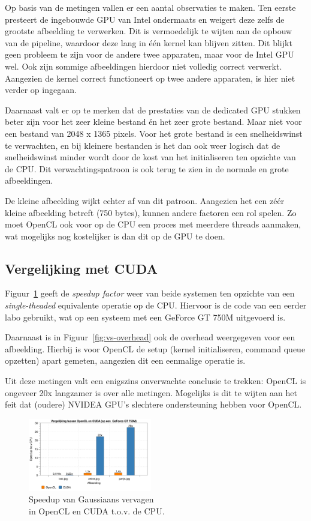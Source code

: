 \documentclass[twocolumn, a4paper]{article}
\begin{document}
Op basis van de metingen vallen er een aantal observaties te maken. Ten eerste presteert de ingebouwde GPU van Intel ondermaats en weigert deze zelfs de grootste afbeelding te verwerken. Dit is vermoedelijk te wijten aan de opbouw van de pipeline, waardoor deze lang in één kernel kan blijven zitten. Dit blijkt geen probleem te zijn voor de andere twee apparaten, maar voor de Intel GPU wel. Ook zijn sommige afbeeldingen hierdoor niet volledig correct verwerkt. Aangezien de kernel correct functioneert op twee andere apparaten, is hier niet verder op ingegaan.

Daarnaast valt er op te merken dat de prestaties van de dedicated GPU stukken beter zijn voor het zeer kleine bestand én het zeer grote bestand. Maar niet voor een bestand van 2048 x 1365 pixels. Voor het grote bestand is een snelheidswinst te verwachten, en bij kleinere bestanden is het dan ook weer logisch dat de snelheidswinst minder wordt door de kost van het initialiseren ten opzichte van de CPU. Dit verwachtingspatroon is ook terug te zien in de normale en grote afbeeldingen. 

De kleine afbeelding wijkt echter af van dit patroon. Aangezien het een zéér kleine afbeelding betreft (750 bytes), kunnen andere factoren een rol spelen. Zo moet OpenCL ook voor op de CPU een proces met meerdere threads aanmaken, wat mogelijks nog kostelijker is dan dit op de GPU te doen. 

\subsection{Vergelijking met CUDA}
Figuur~\ref{fig:vs} geeft de \emph{speedup factor} weer van beide systemen ten opzichte van een \emph{single-theaded} equivalente operatie op de CPU. Hiervoor is de code van een eerder labo gebruikt, wat op een systeem met een GeForce GT 750M uitgevoerd is. 

Daarnaast is in Figuur~\ref{fig:vs-overhead} ook de overhead weergegeven voor een afbeelding. Hierbij is voor OpenCL de setup (kernel initialiseren, command queue opzetten) apart gemeten, aangezien dit een eenmalige operatie is. 

Uit deze metingen valt een enigszins onverwachte conclusie te trekken: OpenCL is ongeveer 20x langzamer is over alle metingen. Mogelijks is dit te wijten aan het feit dat (oudere) NVIDEA GPU's slechtere ondersteuning hebben voor OpenCL.

\begin{figure}
    \centering
    \includegraphics[width=0.48\textwidth]{data/opencl-vs-cuda.png}
    \caption{Speedup van Gaussiaans vervagen \\in OpenCL en CUDA t.o.v. de CPU.}\label{fig:vs}
\end{figure}
\end{document}
